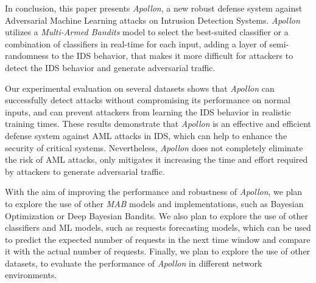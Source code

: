 In conclusion, this paper presents \textit{Apollon}, a new robust defense system against Adversarial Machine Learning attacks
on Intrusion Detection Systems.
\textit{Apollon} utilizes a \textit{Multi-Armed Bandits} model to select the best-suited classifier or a combination of classifiers in
real-time for each input, adding a layer of semi-randomness to the IDS behavior, that makes it more difficult for
attackers to detect the IDS behavior and generate adversarial traffic.

Our experimental evaluation on several datasets shows that \textit{Apollon} can successfully detect attacks without compromising
its performance on normal inputs, and can prevent attackers from learning the IDS behavior in realistic training times.
These results demonstrate that \textit{Apollon} is an effective and efficient defense system against AML attacks in IDS, which
can help to enhance the security of critical systems.
Nevertheless, \textit{Apollon} does not completely eliminate the risk of AML attacks, only mitigates it increasing the
time and effort required by attackers to generate adversarial traffic.

With the aim of improving the performance and robustness of \textit{Apollon}, we plan to explore the use of other \textit{MAB} models and
implementations, such as Bayesian Optimization or Deep Bayesian Bandits.
We also plan to explore the use of other classifiers and ML models, such as requests forecasting models, which can be
used to predict the expected number of requests in the next time window and compare it with the actual number of
requests.
Finally, we plan to explore the use of other datasets, to evaluate the performance of \textit{Apollon} in different network
environments.